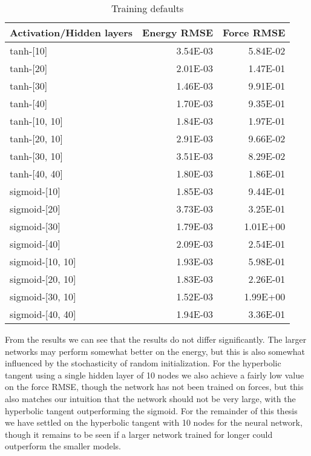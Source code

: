 \begin{table}[H]
\centering
\begin{tabular}{lrr}
\toprule
Activation/Hidden layers &  Energy RMSE &  Force RMSE \\
\midrule
               tanh-[10] &     3.54E-03 &    5.84E-02 \\
               tanh-[20] &     2.01E-03 &    1.47E-01 \\
               tanh-[30] &     1.46E-03 &    9.91E-01 \\
               tanh-[40] &     1.70E-03 &    9.35E-01 \\
           tanh-[10, 10] &     1.84E-03 &    1.97E-01 \\
           tanh-[20, 10] &     2.91E-03 &    9.66E-02 \\
           tanh-[30, 10] &     3.51E-03 &    8.29E-02 \\
           tanh-[40, 40] &     1.80E-03 &    1.86E-01 \\
            sigmoid-[10] &     1.85E-03 &    9.44E-01 \\
            sigmoid-[20] &     3.73E-03 &    3.25E-01 \\
            sigmoid-[30] &     1.79E-03 &    1.01E+00 \\
            sigmoid-[40] &     2.09E-03 &    2.54E-01 \\
        sigmoid-[10, 10] &     1.93E-03 &    5.98E-01 \\
        sigmoid-[20, 10] &     1.83E-03 &    2.26E-01 \\
        sigmoid-[30, 10] &     1.52E-03 &    1.99E+00 \\
        sigmoid-[40, 40] &     1.94E-03 &    3.36E-01 \\
\bottomrule
\end{tabular}
\caption{Training defaults}
\label{table:act-hidden}
\end{table}

From the results we can see that the results do not
differ significantly. The larger networks may perform somewhat
better on the energy, but this is also somewhat influenced by the stochasticity
of random initialization. For the hyperbolic tangent using
a single hidden layer of 10 nodes we also achieve a fairly
low value on the force RMSE, though the network has not been trained
on forces, but this also matches our intuition that the network
should not be very large, with the hyperbolic tangent outperforming
the sigmoid. For the remainder of this thesis we have settled
on the hyperbolic tangent with 10 nodes for the neural network, though it remains
to be seen if a larger network trained for longer could outperform
the smaller models.

